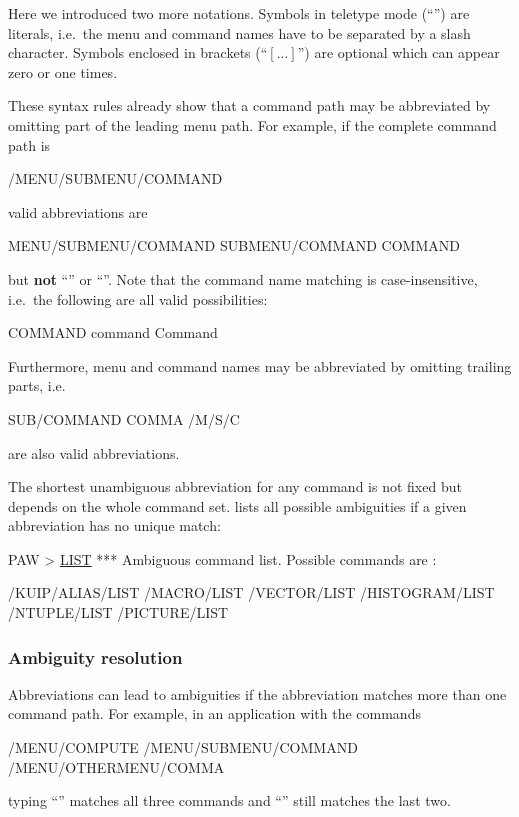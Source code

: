 Here we introduced two more notations.
Symbols in teletype mode (``\Lit{/}'') are literals, i.e.\
the menu and command names have to be separated by a slash character.
Symbols enclosed in brackets (``$[ ... ]$'') are optional which can
appear zero or one times.

These syntax rules already show that a command path may be abbreviated by
omitting part of the leading menu path.
For example, if the complete command path is
\begin{XMP}
/MENU/SUBMENU/COMMAND
\end{XMP}
valid abbreviations are
\begin{XMP}
MENU/SUBMENU/COMMAND
SUBMENU/COMMAND
COMMAND
\end{XMP}
but \textbf{not} ``'' or
``''.
Note that the command name matching is case-insensitive, i.e.\ the
following are all valid possibilities:
\begin{XMP}
COMMAND
command
Command
\end{XMP}

Furthermore, menu and command names may be abbreviated by omitting
trailing parts, i.e.\
\begin{XMP}
SUB/COMMAND
COMMA
/M/S/C
\end{XMP}
are also valid abbreviations.

The shortest unambiguous abbreviation for any command is not fixed
but depends on the whole command set.
\KUIP{} lists all possible ambiguities if a given abbreviation has no
unique match:
\condbreak{4\baselineskip}
\begin{XMP}
PAW > \underline{LIST}
 *** Ambiguous command list. Possible commands are :

 /KUIP/ALIAS/LIST
 /MACRO/LIST
 /VECTOR/LIST
 /HISTOGRAM/LIST
 /NTUPLE/LIST
 /PICTURE/LIST
\end{XMP}

%
%
\subsubsection{Ambiguity resolution}

Abbreviations can lead to ambiguities if the abbreviation matches
more than one command path.
For example, in an application with the commands
\begin{XMP}
/MENU/COMPUTE
/MENU/SUBMENU/COMMAND
/MENU/OTHERMENU/COMMA
\end{XMP}
typing ``'' matches all three commands and ``''
still matches the last two.

